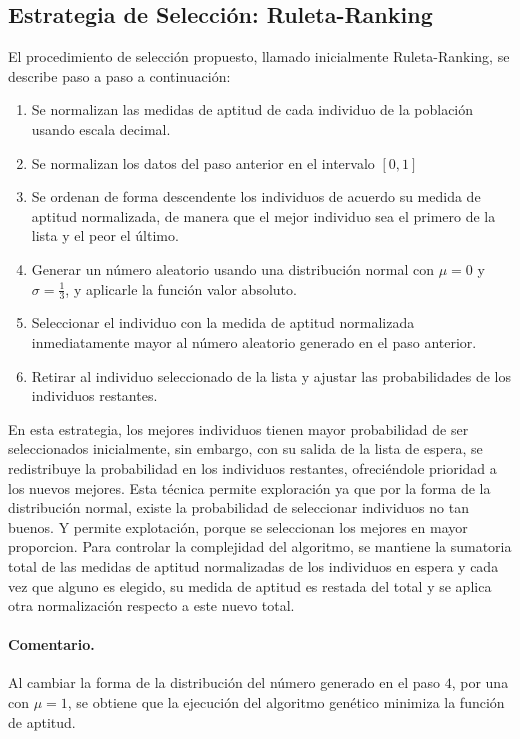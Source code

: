 \documentclass{llncs}
\begin{document}
\subsection{Estrategia de Selección: Ruleta-Ranking}
El procedimiento de selección propuesto, llamado inicialmente Ruleta-Ranking, se describe paso a paso a continuación:
\begin{enumerate}
\item Se normalizan las medidas de aptitud de cada individuo de la población usando escala decimal.
\item Se normalizan los datos del paso anterior en el intervalo $[0,1]$
\item Se ordenan de forma descendente los individuos de acuerdo su medida de aptitud normalizada, de manera que el mejor individuo sea el primero de la lista y el peor el último.
\item Generar un número aleatorio usando una distribución normal con $\mu=0$ y $\sigma=\frac{1}{3}$, y aplicarle la función valor absoluto.
\item Seleccionar el individuo con la medida de aptitud normalizada inmediatamente mayor al número aleatorio generado en el paso anterior.
\item Retirar al individuo seleccionado de la lista y ajustar las probabilidades de los individuos restantes.
\end{enumerate}
En esta estrategia, los mejores individuos tienen mayor probabilidad de ser seleccionados inicialmente, sin embargo, con su salida de la lista de espera, se redistribuye la probabilidad en los individuos restantes, ofreciéndole prioridad a los nuevos mejores. Esta técnica permite exploración ya que por la forma de la distribución normal, existe la probabilidad de seleccionar individuos no tan buenos. Y permite explotación, porque se seleccionan los mejores en mayor proporcion. 
Para controlar la complejidad del algoritmo, se mantiene la sumatoria total de las medidas de aptitud normalizadas de los individuos en espera y cada vez que alguno es elegido, su medida de aptitud es restada del total y se aplica otra normalización respecto a este nuevo total.

\paragraph{Comentario.}
Al cambiar la forma de la distribución del número generado en el paso $4$, por una con $\mu=1$, se obtiene que la ejecución del algoritmo genético minimiza la función de aptitud.
\end{document}
